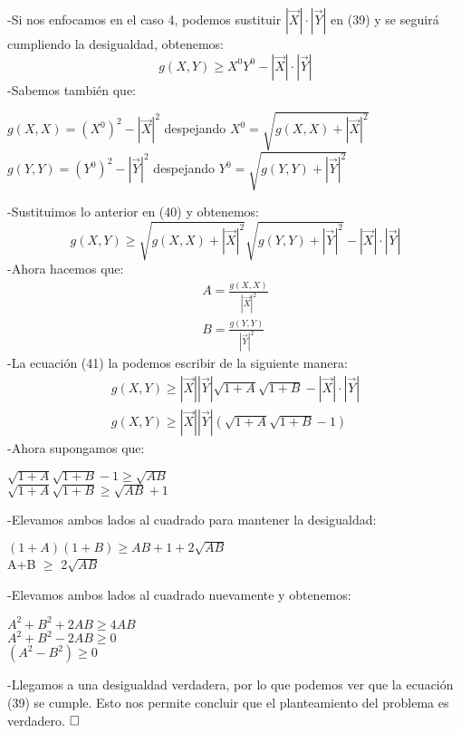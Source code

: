 \documentclass[a4paper, 11pt]{article}
\begin{document}
-Si nos enfocamos en el caso 4, podemos sustituir $|\vec{X}| \cdot |\vec{Y}|$ en (39) y se seguirá cumpliendo la desigualdad, obtenemos:
\begin{equation}
    g(X,Y)\geq X^{0}Y^{0} - |\vec{X}| \cdot |\vec{Y}|
\end{equation}
-Sabemos también que:
\begin{center}
    $g(X,X)= (X^{0})^2-|\vec{X}|^2$ despejando $X^{0}=\sqrt{g(X,X)+|\vec{X}|^2}$\\
    $g(Y,Y)= (Y^{0})^2-|\vec{Y}|^2$ despejando $Y^{0}=\sqrt{g(Y,Y)+|\vec{Y}|^2}$
\end{center}
-Sustituimos lo anterior en (40) y obtenemos:
\begin{equation}
    g(X,Y)\geq \sqrt{g(X,X)+|\vec{X}|^2} \sqrt{g(Y,Y)+|\vec{Y}|^2} - |\vec{X}| \cdot |\vec{Y}|
\end{equation}
-Ahora hacemos que: 
\begin{eqnarray}
\nonumber A=\frac{g(X,X)}{|\vec{X}|^2}\\
\nonumber B=\frac{g(Y,Y)}{|\vec{Y}|^2}
\end{eqnarray}
-La ecuación (41) la podemos escribir de la siguiente manera:
\begin{eqnarray}
\nonumber   g(X,Y)\geq |\vec{X}||\vec{Y}| \sqrt{1+A} \sqrt{1+B} - |\vec{X}| \cdot |\vec{Y}|\\
\nonumber g(X,Y)\geq |\vec{X}||\vec{Y}| (\sqrt{1+A} \sqrt{1+B} - 1)
\end{eqnarray}
-Ahora supongamos que:
\begin{center}
    $\sqrt{1+A} \sqrt{1+B} - 1\geq \sqrt{AB}$\\
    $\sqrt{1+A} \sqrt{1+B} \geq \sqrt{AB}+1$
\end{center}
-Elevamos ambos lados al cuadrado para mantener la desigualdad:
\begin{center}
    $(1+A)(1+B) \geq AB+1+2\sqrt{AB}$\\
    A+B $\geq$ 2$\sqrt{AB}$
\end{center}
-Elevamos ambos lados al cuadrado nuevamente y obtenemos:
\begin{center}
    $A^2+B^2+2AB\geq 4AB$\\
    $A^2+B^2-2AB \geq 0$\\
    $(A^2-B^2)\geq 0$
\end{center}
-Llegamos a una desigualdad verdadera, por lo que podemos ver que la ecuación (39) se cumple. Esto nos permite concluir que el planteamiento del problema es verdadero. $\hfill\square$
\end{document}
